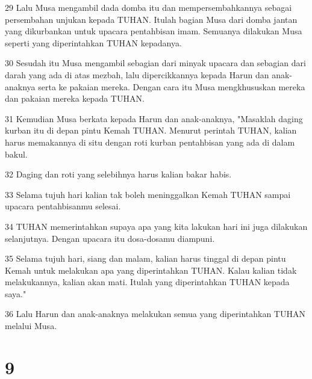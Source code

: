 \par 29 Lalu Musa mengambil dada domba itu dan mempersembahkannya sebagai persembahan unjukan kepada TUHAN. Itulah bagian Musa dari domba jantan yang dikurbankan untuk upacara pentahbisan imam. Semuanya dilakukan Musa seperti yang diperintahkan TUHAN kepadanya.
\par 30 Sesudah itu Musa mengambil sebagian dari minyak upacara dan sebagian dari darah yang ada di atas mezbah, lalu dipercikkannya kepada Harun dan anak-anaknya serta ke pakaian mereka. Dengan cara itu Musa mengkhususkan mereka dan pakaian mereka kepada TUHAN.
\par 31 Kemudian Musa berkata kepada Harun dan anak-anaknya, "Masaklah daging kurban itu di depan pintu Kemah TUHAN. Menurut perintah TUHAN, kalian harus memakannya di situ dengan roti kurban pentahbisan yang ada di dalam bakul.
\par 32 Daging dan roti yang selebihnya harus kalian bakar habis.
\par 33 Selama tujuh hari kalian tak boleh meninggalkan Kemah TUHAN sampai upacara pentahbisanmu selesai.
\par 34 TUHAN memerintahkan supaya apa yang kita lakukan hari ini juga dilakukan selanjutnya. Dengan upacara itu dosa-dosamu diampuni.
\par 35 Selama tujuh hari, siang dan malam, kalian harus tinggal di depan pintu Kemah untuk melakukan apa yang diperintahkan TUHAN. Kalau kalian tidak melakukannya, kalian akan mati. Itulah yang diperintahkan TUHAN kepada saya."
\par 36 Lalu Harun dan anak-anaknya melakukan semua yang diperintahkan TUHAN melalui Musa.

\chapter{9}

